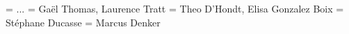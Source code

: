 \documentclass[a4paper,12pt,twoside]{../includes/ThesisStyle}
\begin{document}
\fi

\ThesisDate{}
\ThesisLilleI
\President = {
...
} 
\Rapporteurs = {
Ga\"el Thomas,
Laurence Tratt 
} 
\Examinateurs = {
Theo D'Hondt,
Elisa Gonzalez Boix
} 
\Directeur = {
St\'ephane Ducasse
}
\Coencadreur = {
Marcus Denker}

\MakeThesisTitlePage 

\ifx\wholebook\relax\else
    
\end{document}
